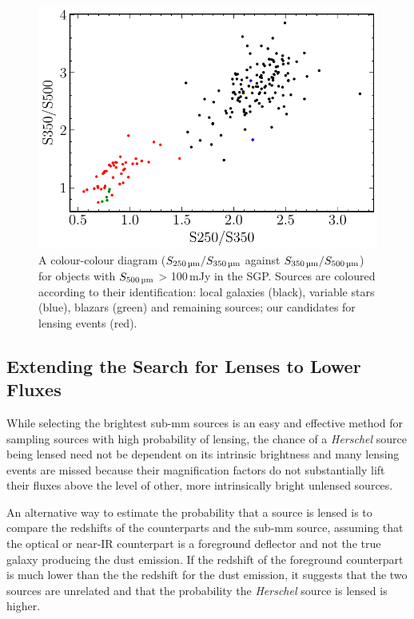 \begin{figure}
    \centering
    \includegraphics[width=\columnwidth]{Figures/submm_colours_lensed_candidates.pdf}
    \caption{A colour-colour diagram ($S_{\textrm{250\,\micron}}/S_{\textrm{350\,\micron}}$ against $S_{\textrm{350\,\micron}}/S_{\textrm{500\,\micron}}$) for objects with $S_{\textrm{500\,\micron}}$ > 100\,mJy in the SGP. Sources are coloured according to their identification: local galaxies (black), variable stars (blue), blazars (green) and remaining sources; our candidates for lensing events (red).}
    \label{fig:submm_colours_lensed_candidates}
\end{figure}

\subsection{Extending the Search for Lenses to Lower Fluxes}

While selecting the brightest sub-mm sources is an easy and effective method for sampling sources with high probability of lensing, the chance of a \textit{Herschel} source being lensed need not be dependent on its intrinsic brightness and many lensing events are missed because their magnification factors do not substantially lift their fluxes above the level of other, more intrinsically bright unlensed sources.

An alternative way to estimate the probability that a source is lensed is to compare the redshifts of the counterparts and the sub-mm source, assuming that the optical or near-IR counterpart is a foreground deflector and not the true galaxy producing the dust emission. If the redshift of the foreground counterpart is much lower than the the redshift for the dust emission, it suggests that the two sources are unrelated and that the probability the \textit{Herschel} source is lensed is higher.

